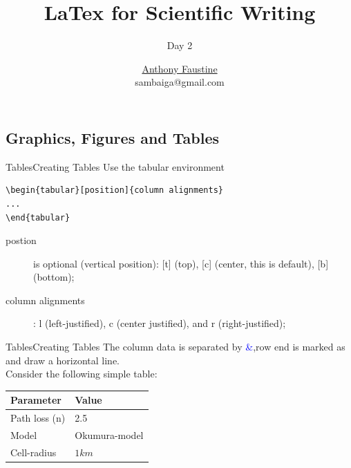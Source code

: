 \documentclass{beamer}
\title{ LaTex for Scientific Writing} %
\subtitle{Day 2} %
\author{\href{sambaiga.github.io}{Anthony Faustine} \\sambaiga@gmail.com}
\begin{document}
  \frame{\maketitle}


  \begin{darkframes}
    


\section{Graphics, Figures and Tables}

\begin{frame}[fragile]{Tables}{Creating Tables}
Use the tabular environment
\begin{verbatim}
\begin{tabular}[position]{column alignments}
...
\end{tabular}
\end{verbatim}

\begin{description}
	\item[postion] is optional (vertical position): [t] (top), [c]
	(center, this is default), [b] (bottom);
	\item [column alignments]: l (left-justified), c (center justified),
	and r (right-justified);
\end{description}
\end{frame}

\begin{frame}[fragile]{Tables}{Creating Tables}
The column data is separated by \textcolor{blue}{\&},row end is marked as \texttt{\\} and \texttt{\hline} draw a horizontal line.\\
Consider the following simple table:\\


\begin{tabular}[c]{|l|l|}
	\hline 
	\textbf{Parameter} & \textbf{Value}\\
	\hline 
	Path loss (n) & 2.5\\
	Model & Okumura-model\\
	Cell-radius & $1km$\\
	\hline
\end{tabular}


\end{frame}
\end{darkframes}
\end{document}
